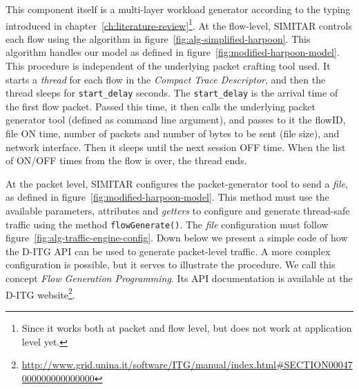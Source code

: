 This component itself is a multi-layer workload generator according to the typing introduced in chapter~\ref{ch:literature-review}\footnote{Since it works both at packet and flow level, but does not work at application level yet.}. At the flow-level, SIMITAR controls each flow using the algorithm in figure~\ref{fig:alg-simplified-harpoon}. This algorithm handles our model as defined in figure~\ref{fig:modified-harpoon-model}. This procedure is independent of the underlying packet crafting tool used. It starts a \textit{thread} for each flow in the \textit{Compact Trace Descriptor}, and then the thread sleeps for \texttt{start\_delay} seconds. The \texttt{start\_delay} is the arrival time of the first flow packet. Passed this time, it then calls the underlying packet generator tool (defined as command line argument), and passes to it the flowID, file ON time, number of packets and number of bytes to be sent (file size), and network interface. Then it sleeps until the next session OFF time. When the list of ON/OFF times from the flow is over, the thread ends.


At the packet level, SIMITAR configures the packet-generator tool to send a \textit{file}, as defined in figure~\ref{fig:modified-harpoon-model}. This method must use the available parameters, attributes and \textit{getters} to configure and generate thread-safe traffic using the method \texttt{flowGenerate()}. The \textit{file} configuration must follow figure~\ref{fig:alg-traffic-engine-config}. Down below we present a simple code of how the D-ITG API can be used to generate packet-level traffic. A more complex configuration is possible, but it serves to illustrate the procedure. We call this concept \textit{Flow Generation Programming}. Its API documentation is available at the D-ITG website\footnote{\href{http://www.grid.unina.it/software/ITG/manual/index.html\#SECTION00047000000000000000}{http://www.grid.unina.it/software/ITG/manual/index.html\#SECTION00047000000000000000}}.

